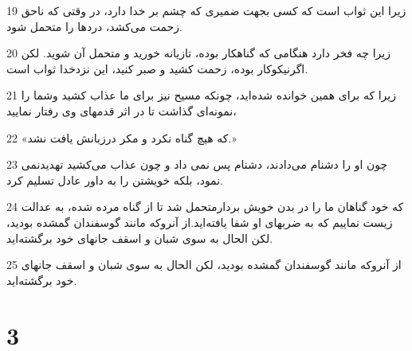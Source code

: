 \par 19 زیرا این ثواب است که کسی بجهت ضمیری که چشم بر خدا دارد، در وقتی که ناحق زحمت می‌کشد، دردها را متحمل شود.
\par 20 زیرا چه فخر دارد هنگامی که گناهکار بوده، تازیانه خورید و متحمل آن شوید. لکن اگرنیکوکار بوده، زحمت کشید و صبر کنید، این نزدخدا ثواب است.
\par 21 زیرا که برای همین خوانده شده‌اید، چونکه مسیح نیز برای ما عذاب کشید وشما را نمونه‌ای گذاشت تا در اثر قدمهای وی رفتار نمایید،
\par 22 «که هیچ گناه نکرد و مکر درزبانش یافت نشد.»
\par 23 چون او را دشنام می‌دادند، دشنام پس نمی داد و چون عذاب می‌کشید تهدیدنمی نمود، بلکه خویشتن را به داور عادل تسلیم کرد.
\par 24 که خود گناهان ما را در بدن خویش بردارمتحمل شد تا از گناه مرده شده، به عدالت زیست نماییم که به ضربهای او شفا یافته‌اید.از آنروکه مانند گوسفندان گمشده بودید، لکن الحال به سوی شبان و اسقف جانهای خود برگشته‌اید.
\par 25 از آنروکه مانند گوسفندان گمشده بودید، لکن الحال به سوی شبان و اسقف جانهای خود برگشته‌اید.

\chapter{3}


